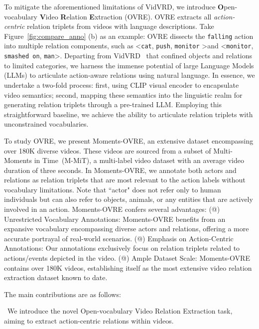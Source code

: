 \documentclass[letterpaper]{article}
\makeatletter
\newcommand{\Rmnum}[1]{\expandafter\@slowromancap\romannumeral #1@}
\makeatother
\begin{document}
To mitigate the aforementioned limitations of VidVRD, we introduce \textbf{O}pen-vocabulary \textbf{V}ideo \textbf{R}elation \textbf{E}xtraction (OVRE). OVRE extracts all \emph{action-centric} relation triplets from videos with language descriptions. Take Figure~\ref{fig:compare_anno} (b) as an example: OVRE dissects the \texttt{falling} action into multiple relation components, such as  \textless \texttt{cat}, \texttt{push}, \texttt{monitor} \textgreater and  \textless \texttt{monitor}, \texttt{smashed on}, \texttt{man}\textgreater.
Departing from VidVRD~\cite{Shang2017VideoVR} that confined objects and relations to limited categories, we harness the immense potential of large Language Models (LLMs) to articulate action-aware relations using natural language. In essence, we undertake a two-fold process: first, using CLIP visual encoder to encapsulate video semantics; second, mapping these semantics into the linguistic realm for generating relation triplets through a pre-trained LLM. Employing this straightforward baseline, we achieve the ability to articulate relation triplets with unconstrained vocabularies.

To study OVRE, we present Moments-OVRE, an extensive dataset encompassing over 180K diverse videos.
These videos are sourced from a subset of Multi-Moments in Time~\cite{9609554}(M-MiT), a multi-label video dataset with an average video duration of three seconds.
In Moments-OVRE, we annotate both actors and relations as relation triplets that are most relevant to the action labels without vocabulary limitations. Note that ``actor" does not refer only to human individuals but can also refer to objects, animals, or any entities that are actively involved in an action.
Moments-OVRE confers several advantages:
(\Rmnum{1}) Unrestricted Vocabulary Annotations: Moments-OVRE benefits from an expansive vocabulary encompassing diverse actors and relations, offering a more accurate portrayal of real-world scenarios.
(\Rmnum{2}) Emphasis on Action-Centric Annotations: Our annotations exclusively focus on relation triplets related to actions/events depicted in the video.
(\Rmnum{3}) Ample Dataset Scale: Moments-OVRE contains over 180K videos, establishing itself as the most extensive video relation extraction dataset known to date.



The main contributions are as follows:

\textbullet \ We introduce the novel Open-vocabulary Video Relation Extraction task, aiming to extract action-centric relations within videos. %
\end{document}
